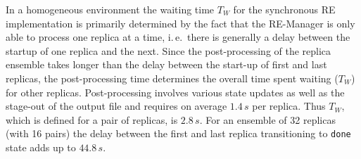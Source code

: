 \documentclass{rspublic}
\newcommand{\alnote}[1]{ {\textcolor{blue} { ***andre: #1 }}}
\newcommand{\athotanote}[1]{ {\textcolor{green} { ***athota: #1 }}}
\newcommand{\alnote}[1]{}
\newcommand{\athotanote}[1]{}
\begin{document}


In a homogeneous environment the waiting time $T_{W}$ for the
synchronous RE implementation is primarily determined by the fact that
the RE-Manager is only able to process one replica at a time, i.\,e.\
there is generally a delay between the startup of one replica and the
next. Since the post-processing of the replica ensemble takes longer
than the delay between the start-up of first and last replicas, the
post-processing time determines the overall time spent waiting ($T_W$)
for other replicas.  Post-processing involves various state updates as
well as the stage-out of the output file and requires on average
$1.4\,s$ per replica.  Thus $T_{W}$, which is defined for a pair of
replicas, is $2.8\,s$.  For an ensemble of 32 replicas (with 16 pairs)
the delay between the first and last replica transitioning to
\texttt{done} state adds up to $44.8\,s$.

\end{document}
